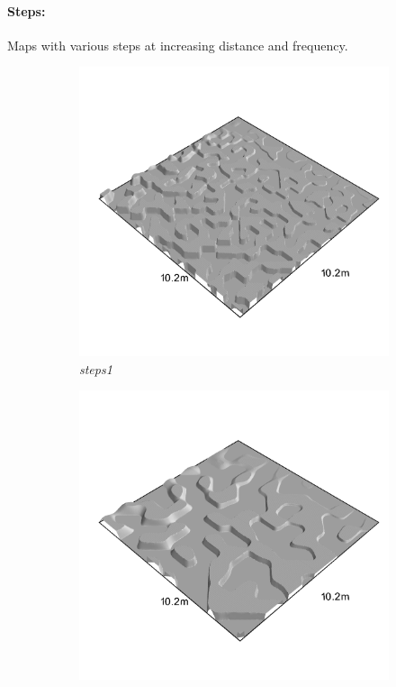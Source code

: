 \documentclass[../document.tex]{subfiles}
\begin{document}
\paragraph{Steps:}  Maps with various steps at increasing distance and frequency.
\begin{figure}[H]
    \centering
        \begin{subfigure}[b]{0.23\textwidth}
            \includegraphics[width=\textwidth]{../img/hm3d_borders/steps1.png}
            \caption{\emph{steps1}}
        \end{subfigure}
        \begin{subfigure}[b]{0.23\linewidth}
            \includegraphics[width=\textwidth]{../img/hm3d_borders/steps2.png}

\end{subfigure}
\end{figure}
\end{document}
